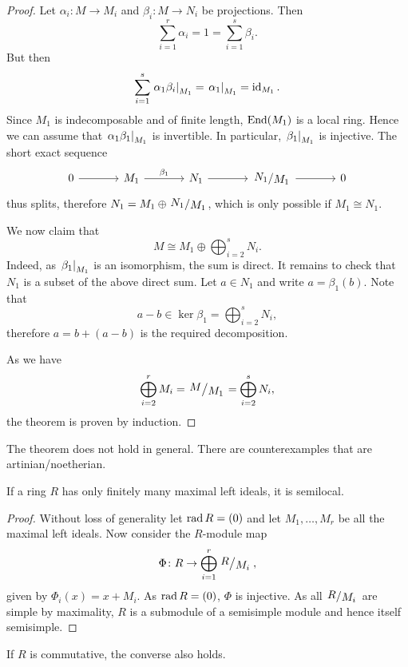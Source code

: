 \begin{proof}
Let $\alpha_i \colon M \to M_i$ and $\beta_i \colon M \to N_i$ be
projections. Then
\[
\sum_{i=1}^r \alpha_i = 1 = \sum_{i=1}^s \beta_i.
\]
But then
\[
\sum_{i=1}^s \left. \alpha_1 \beta_i\right|_{M_1}^{} =
\left. \alpha_1\right|_{M_1}^{} =
\operatorname{id}_{M_1}.
\]
Since $M_1$ is indecomposable and of finite length, $\operatorname{End}(M_1)$ is
a local ring. Hence we can assume that
$\left. \alpha_1 \beta_1\right|_{M_1}^{}$ is invertible. In particular,
$\left. \beta_1\right|_{M_1}^{}$ is injective. The short exact sequence
\[
\begin{tikzcd}[row sep = large, column sep = large]
0 \arrow[r] & M_1 \arrow[r, "\beta_1"] &
N_1 \arrow[r] & \kvoc{N_1}{M_1} \arrow[r] & 0
\end{tikzcd}
\]
thus splits, therefore $N_1 = M_1 \oplus \kvoc{N_1}{M_1}$, which is
only possible if $M_1 \cong N_1$.

We now claim that
\[
M \cong M_1 \oplus \bigoplus_{i=2}^s N_i.
\]
Indeed, as $\left. \beta_1\right|_{M_1}^{}$ is an isomorphism, the sum is
direct. It remains to check that $N_1$ is a subset of the above
direct sum. Let $a \in N_1$ and write $a = \beta_1(b)$. Note that
\[
a - b \in \ker \beta_1 = \bigoplus_{i=2}^s N_i,
\]
therefore $a = b + (a-b)$ is the required decomposition.

As we have
\[
\bigoplus_{i=2}^r M_i = \kvoc{M}{M_1} = \bigoplus_{i=2}^s N_i,
\]
the theorem is proven by induction.
\end{proof}

\begin{opomba}
The theorem does not hold in general. There are counterexamples
that are artinian/noetherian.
\end{opomba}

\begin{trditev}
If a ring $R$ has only finitely many maximal left ideals, it is
semilocal.
\end{trditev}

\begin{proof}
Without loss of generality let $\operatorname{rad} R = (0)$ and let
$M_1, \dots, M_r$ be all the maximal left ideals. Now consider the
$R$-module map
\[
\Phi \colon R \to \bigoplus_{i=1}^r \kvoc{R}{M_i},
\]
given by $\Phi_i(x) = x + M_i$. As $\operatorname{rad} R = (0)$, $\Phi$ is
injective. As all $\kvoc{R}{M_i}$ are simple by maximality, $R$ is
a submodule of a semisimple module and hence itself semisimple.
\end{proof}

\begin{opomba}
If $R$ is commutative, the converse also holds.
\end{opomba}

